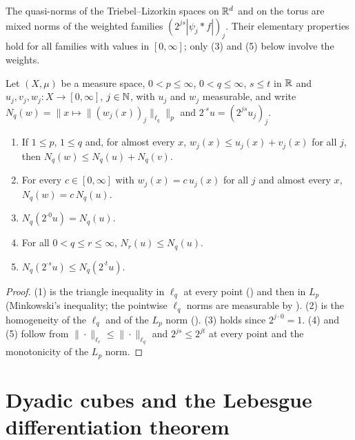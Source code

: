 The quasi-norms of the Triebel--Lizorkin spaces on $\mathbb{R}^d$ and on the torus are mixed norms of
the weighted families $(2^{js} |\psi_j * f|)_j$. Their elementary properties hold for all
families with values in $[0, \infty]$; only (3) and (5) below involve the weights.

\begin{lemma}
\label{lem:mixed-norm-dyadic-family}
\leanok
{}
Let $(X, \mu)$ be a measure space, $0 < p \leq \infty$, $0 < q \leq \infty$, $s \leq t$ in $\mathbb{R}$ and
$u_j, v_j, w_j \colon X \to [0, \infty]$, $j \in \mathbb{N}$, with $u_j$ and $w_j$ measurable, and write
$N_q(w) = \bigl\| x \mapsto \|(w_j(x))_j\|_{\ell_q} \bigr\|_p$ and
$2^{\cdot s} u = (2^{js} u_j)_j$.
\begin{enumerate}
  \item If $1 \leq p$, $1 \leq q$ and, for almost every $x$, $w_j(x) \leq u_j(x) + v_j(x)$ for
    all $j$, then $N_q(w) \leq N_q(u) + N_q(v)$.
  \item For every $c \in [0, \infty]$ with $w_j(x) = c \, u_j(x)$ for all $j$ and almost every
    $x$, $N_q(w) = c \, N_q(u)$.
  \item $N_q(2^{\cdot 0} u) = N_q(u)$.
  \item For all $0 < q \leq r \leq \infty$, $N_r(u) \leq N_q(u)$.
  \item $N_q(2^{\cdot s} u) \leq N_q(2^{\cdot t} u)$.
\end{enumerate}
\end{lemma}

\begin{proof}
\leanok
(1) is the triangle inequality in $\ell_q$ at every point () and then in
$L_p$ (Minkowski's inequality; the pointwise $\ell_q$ norms are measurable by
). (2) is the homogeneity of the $\ell_q$ and of the $L_p$ norm
(). (3) holds since $2^{j \cdot 0} = 1$. (4) and (5) follow from
$\|\cdot\|_{\ell_r} \leq \|\cdot\|_{\ell_q}$ and $2^{js} \leq 2^{jt}$ at every point and the
monotonicity of the $L_p$ norm.
\end{proof}

\section{Dyadic cubes and the Lebesgue differentiation theorem}


